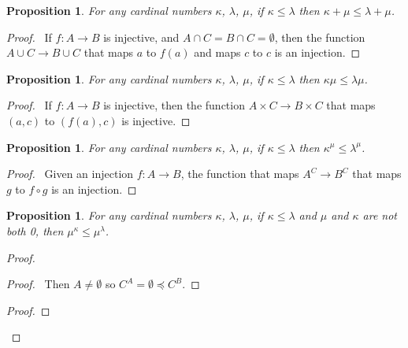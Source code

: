 \documentclass{book}
\let\qed\relax
\newtheorem{prop}[ax]{Proposition}
\theoremstyle{definition}
\begin{document}
\begin{prop}
For any cardinal numbers $\kappa$, $\lambda$, $\mu$, if $\kappa \leq \lambda$ then $\kappa + \mu \leq \lambda + \mu$.
\end{prop}

\begin{proof}
\pf\ If $f : A \rightarrow B$ is injective, and $A \cap C = B \cap C = \emptyset$, then the function $A \cup C \rightarrow B \cup C$ that maps $a$ to $f(a)$ and maps $c$ to $c$ is an injection. \qed
\end{proof}

\begin{prop}
For any cardinal numbers $\kappa$, $\lambda$, $\mu$, if $\kappa \leq \lambda$ then $\kappa \mu \leq \lambda \mu$.
\end{prop}

\begin{proof}
\pf\ If $f : A \rightarrow B$ is injective, then the function $A \times C \rightarrow B \times C$ that maps $(a,c)$ to $(f(a),c)$ is injective. \qed
\end{proof}

\begin{prop}
For any cardinal numbers $\kappa$, $\lambda$, $\mu$, if $\kappa \leq \lambda$ then $\kappa^\mu \leq \lambda^\mu$.
\end{prop}

\begin{proof}
\pf\ Given an injection $f : A \rightarrow B$, the function that maps $A^C \rightarrow B^C$ that maps $g$ to $f \circ g$ is an injection. \qed
\end{proof}

\begin{prop}
For any cardinal numbers $\kappa$, $\lambda$, $\mu$, if $\kappa \leq \lambda$ and $\mu$ and $\kappa$ are not both 0, then $\mu^\kappa \leq \mu^\lambda$.
\end{prop}

\begin{proof}
\pf
{}
\begin{proof}
	\pf\ Then $A \neq \emptyset$ so $C^A = \emptyset \preccurlyeq C^B$.
\end{proof}
\begin{proof}
\end{proof}
\qed
\end{proof}
\end{document}
